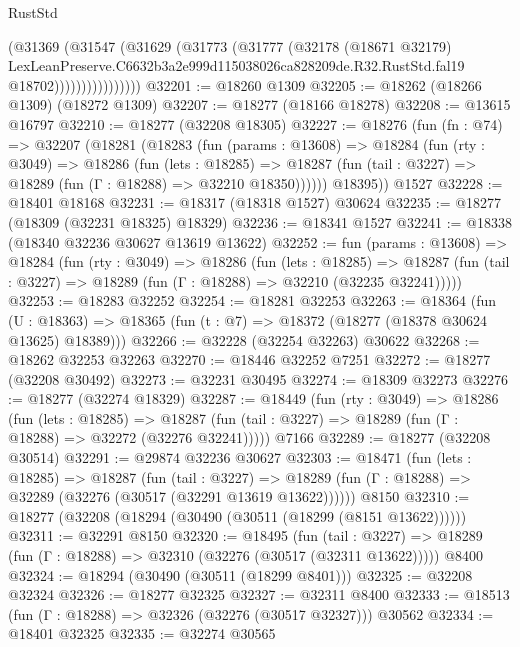 \begin{lexlean}{RustStd}
\begin{coremodule}
                        (@31369
                          (@31547
                            (@31629
                              (@31773
                                (@31777
                                  (@32178
                                    (@18671 @32179)
                                    LexLeanPreserve.C6632b3a2e999d115038026ca828209de.R32.RustStd.fal19
                                    @18702))))))))))))))))
@32201 := @18260 @1309
@32205 := @18262 (@18266 @1309) (@18272 @1309)
@32207 := @18277 (@18166 @18278)
@32208 := @13615 @16797
@32210 := @18277 (@32208 @18305)
@32227 := @18276
    (fun (fn : @74) =>
    @32207
      (@18281
        (@18283
          (fun (params : @13608) =>
          @18284
            (fun (rty : @3049) =>
            @18286
              (fun (lets : @18285) =>
              @18287 (fun (tail : @3227) => @18289 (fun (Γ : @18288) => @32210 @18350))))))
        @18395))
    @1527
@32228 := @18401 @18168
@32231 := @18317 (@18318 @1527) @30624
@32235 := @18277 (@18309 (@32231 @18325) @18329)
@32236 := @18341 @1527
@32241 := @18338 (@18340 @32236 @30627 @13619 @13622)
@32252 := fun (params : @13608) =>
  @18284
    (fun (rty : @3049) =>
    @18286
      (fun (lets : @18285) =>
      @18287 (fun (tail : @3227) => @18289 (fun (Γ : @18288) => @32210 (@32235 @32241)))))
@32253 := @18283 @32252
@32254 := @18281 @32253
@32263 := @18364
    (fun (U : @18363) => @18365 (fun (t : @7) => @18372 (@18277 (@18378 @30624 @13625) @18389)))
@32266 := @32228 (@32254 @32263) @30622
@32268 := @18262 @32253 @32263
@32270 := @18446 @32252 @7251
@32272 := @18277 (@32208 @30492)
@32273 := @32231 @30495
@32274 := @18309 @32273
@32276 := @18277 (@32274 @18329)
@32287 := @18449
    (fun (rty : @3049) =>
    @18286
      (fun (lets : @18285) =>
      @18287 (fun (tail : @3227) => @18289 (fun (Γ : @18288) => @32272 (@32276 @32241)))))
    @7166
@32289 := @18277 (@32208 @30514)
@32291 := @29874 @32236 @30627
@32303 := @18471
    (fun (lets : @18285) =>
    @18287
      (fun (tail : @3227) =>
      @18289 (fun (Γ : @18288) => @32289 (@32276 (@30517 (@32291 @13619 @13622))))))
    @8150
@32310 := @18277 (@32208 (@18294 (@30490 (@30511 (@18299 (@8151 @13622))))))
@32311 := @32291 @8150
@32320 := @18495
    (fun (tail : @3227) => @18289 (fun (Γ : @18288) => @32310 (@32276 (@30517 (@32311 @13622)))))
    @8400
@32324 := @18294 (@30490 (@30511 (@18299 @8401)))
@32325 := @32208 @32324
@32326 := @18277 @32325
@32327 := @32311 @8400
@32333 := @18513 (fun (Γ : @18288) => @32326 (@32276 (@30517 @32327))) @30562
@32334 := @18401 @32325
@32335 := @32274 @30565

\end{coremodule}
\end{lexlean}

